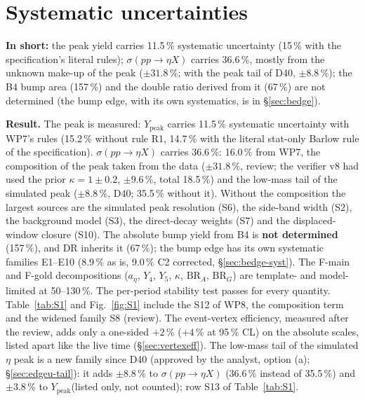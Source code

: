 \documentclass[11pt,a4paper]{article}
\newcommand{\aEta}{\ensuremath{a_\eta}\xspace}
\newcommand{\Ypeak}{\ensuremath{Y_{\mathrm{peak}}}\xspace}
\newcommand{\BRG}{\ensuremath{\mathrm{BR}_G}\xspace}
\newcommand{\BRA}{\ensuremath{\mathrm{BR}_A}\xspace}
\newcommand{\sigeta}{\ensuremath{\sigma(pp\to\eta X)}\xspace}
\newcommand{\notebox}[1]{\par\noindent\colorbox{orange!10}{\parbox{\dimexpr\linewidth-2\fboxsep\relax}{#1}}\par}
\newcommand{\tipbox}[1]{\par\noindent\colorbox{blue!6}{\parbox{\dimexpr\linewidth-2\fboxsep\relax}{#1}}\par}
\newcommand{\inshort}[1]{\tipbox{\textbf{In short:} #1}}%
\begin{document}
\section{Systematic uncertainties}
\label{sec:syst}
\inshort{the peak yield carries 11.5\,\% systematic uncertainty (15\,\% with the specification's literal rules); \sigeta carries 36.6\,\%, mostly from the unknown make-up of the peak ($\pm31.8$\,\%; with the peak tail of D40, $\pm8.8$\,\%); the B4 bump area (157\,\%) and the double ratio derived from it (67\,\%) are not determined (the bump edge, with its own systematics, is in \S\ref{sec:bedge}).}
\notebox{\textbf{Result.} The peak is measured: \Ypeak carries 11.5\,\% systematic uncertainty with WP7's rules (15.2\,\% without rule R1,
14.7\,\% with the literal stat-only Barlow rule of the specification). \sigeta carries 36.6\,\%: 16.0\,\% from WP7, the composition of the
peak taken from the data ($\pm31.8$\,\%, review; the verifier v8 had used the prior $\kappa=1\pm0.2$, $\pm9.6$\,\%, total 18.5\,\%) and the
low-mass tail of the simulated peak ($\pm8.8$\,\%, D40; 35.5\,\% without it). Without
the composition the largest sources are the simulated peak resolution (S6), the side-band width (S2), the background model (S3), the
direct-decay weights (S7) and the displaced-window closure (S10). The absolute bump yield from B4 is \textbf{not determined} (157\,\%), and DR
inherits it (67\,\%); the bump edge has its own systematic families E1--E10 (8.9\,\% as is, 9.0\,\% C2 corrected, \S\ref{sec:bedge-syst}). The F-main and F-gold decompositions (\aEta, $Y_4$, $Y_5$, $\kappa$, \BRA, \BRG) are template- and model-limited at
50--130\,\%. The per-period stability test passes for every quantity. Table~\ref{tab:S1} and Fig.~\ref{fig:S1} include the S12 of WP8, the
composition term and the widened family S8 (review). The event-vertex efficiency, measured after the review, adds only a one-sided
$+2$\,\% ($+4$\,\% at 95\,\% CL) on the absolute scales, listed apart like the live time (\S\ref{sec:vertexeff}). The low-mass tail of the
simulated $\eta$ peak is a new family since D40 (approved by the analyst, option (a); \S\ref{sec:edgeu-tail}): it adds $\pm8.8$\,\% to \sigeta
(36.6\,\% instead of 35.5\,\%) and $\pm3.8$\,\% to \Ypeak (listed only, not counted); row S13 of Table~\ref{tab:S1}.}
\end{document}
